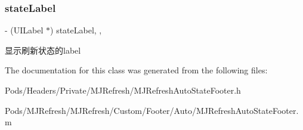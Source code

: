\subsubsection{\texorpdfstring{state\+Label}{stateLabel}}
{\footnotesize\ttfamily -\/ (U\+I\+Label $\ast$) state\+Label\hspace{0.3cm}{\ttfamily [read]}, {\ttfamily [nonatomic]}, {\ttfamily [weak]}}

显示刷新状态的label 

The documentation for this class was generated from the following files\+:\begin{DoxyCompactItemize}
\item 
Pods/\+Headers/\+Private/\+M\+J\+Refresh/M\+J\+Refresh\+Auto\+State\+Footer.\+h\item 
Pods/\+M\+J\+Refresh/\+M\+J\+Refresh/\+Custom/\+Footer/\+Auto/M\+J\+Refresh\+Auto\+State\+Footer.\+m\end{DoxyCompactItemize}
